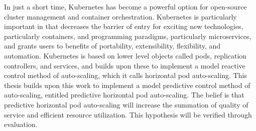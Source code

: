 In just a short time, Kubernetes has become a powerful option for open-source
cluster management and container orchestration. Kubernetes is particularly
important in that decreases the barrier of entry for exciting new technologies,
particularly containers, and programming paradigms, particularly microservices,
and grants users to benefits of portability, extensibility, flexibility, and
automation. Kubernetes is based on lower level objects called pods, replication
controllers, and services, and builds upon these to implement a model reactive
control method of auto-scaling, which it calls horizontal pod auto-scaling. This
thesis builds upon this work to implement a model predictive control method of
auto-scaling, entitled predictive horizontal pod auto-scaling. The belief is
that predictive horizontal pod auto-scaling will increase the summation of
quality of service and efficient resource utilization. This hypothesis will be
verified through evaluation.
